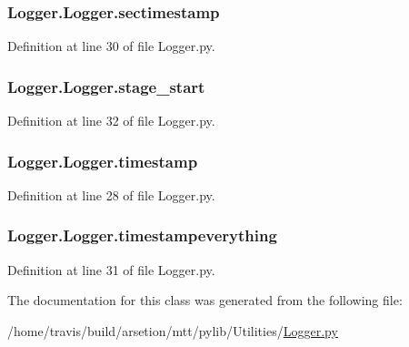 \hypertarget{classLogger_1_1Logger_a9d1172c2a7abb0264b9e41368475ffe7}{
\subsubsection[{sectimestamp}]{\setlength{\rightskip}{0pt plus 5cm}Logger.\-Logger.\-sectimestamp}}\label{classLogger_1_1Logger_a9d1172c2a7abb0264b9e41368475ffe7}


Definition at line 30 of file Logger.\-py.

\hypertarget{classLogger_1_1Logger_a639adf5e0d4f73bdb942e9652903231f}{
\subsubsection[{stage\-\_\-start}]{\setlength{\rightskip}{0pt plus 5cm}Logger.\-Logger.\-stage\-\_\-start}}\label{classLogger_1_1Logger_a639adf5e0d4f73bdb942e9652903231f}


Definition at line 32 of file Logger.\-py.

\hypertarget{classLogger_1_1Logger_af1d68b73fec8eebd0abeafa3bc8fd98b}{
\subsubsection[{timestamp}]{\setlength{\rightskip}{0pt plus 5cm}Logger.\-Logger.\-timestamp}}\label{classLogger_1_1Logger_af1d68b73fec8eebd0abeafa3bc8fd98b}


Definition at line 28 of file Logger.\-py.

\hypertarget{classLogger_1_1Logger_a6012f50ab21e5ab3b89465a972b6a99d}{
\subsubsection[{timestampeverything}]{\setlength{\rightskip}{0pt plus 5cm}Logger.\-Logger.\-timestampeverything}}\label{classLogger_1_1Logger_a6012f50ab21e5ab3b89465a972b6a99d}


Definition at line 31 of file Logger.\-py.



The documentation for this class was generated from the following file\-:\begin{DoxyCompactItemize}
\item 
/home/travis/build/arsetion/mtt/pylib/\-Utilities/\hyperlink{Logger_8py}{Logger.\-py}\end{DoxyCompactItemize}
